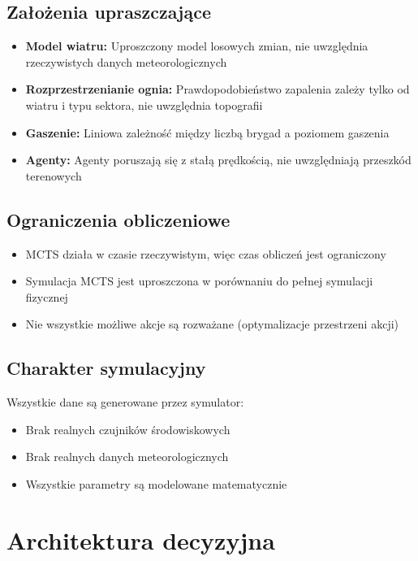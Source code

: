 \documentclass[11pt,a4paper]{article}
\begin{document}
\subsection{Założenia upraszczające}

\begin{itemize}
    \item \textbf{Model wiatru:} Uproszczony model losowych zmian, nie uwzględnia rzeczywistych danych meteorologicznych
    \item \textbf{Rozprzestrzenianie ognia:} Prawdopodobieństwo zapalenia zależy tylko od wiatru i typu sektora, nie uwzględnia topografii
    \item \textbf{Gaszenie:} Liniowa zależność między liczbą brygad a poziomem gaszenia
    \item \textbf{Agenty:} Agenty poruszają się z stałą prędkością, nie uwzględniają przeszkód terenowych
\end{itemize}

\subsection{Ograniczenia obliczeniowe}

\begin{itemize}
    \item MCTS działa w czasie rzeczywistym, więc czas obliczeń jest ograniczony
    \item Symulacja MCTS jest uproszczona w porównaniu do pełnej symulacji fizycznej
    \item Nie wszystkie możliwe akcje są rozważane (optymalizacje przestrzeni akcji)
\end{itemize}

\subsection{Charakter symulacyjny}

Wszystkie dane są generowane przez symulator:
\begin{itemize}
    \item Brak realnych czujników środowiskowych
    \item Brak realnych danych meteorologicznych
    \item Wszystkie parametry są modelowane matematycznie
\end{itemize}

\section{Architektura decyzyjna}
\end{document}
